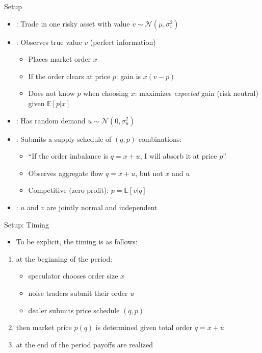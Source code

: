\documentclass[english,10pt
,aspectratio=169
]{beamer}
\begin{document}
\begin{frame}{Setup}
\begin{itemize}
	\item {}: Trade in one risky asset with value  $v \sim \mathcal{N}(\mu, \sigma^2_v)$
	\item {}: Observes true value $v$ (perfect information)
	\begin{itemize}
		\item Places market order $x$
		\item If the order clears at price $p$: gain is $x(v-p)$
		\item Does \alert{not know} $p$ when choosing $x$: maximizes \emph{expected} gain (risk neutral) given $\mathbb{E}[p|x]$
	\end{itemize}
	\item {}: Has random demand $u \sim \mathcal{N}(0, \sigma^2_u)$
	\item {}: Submits a supply schedule of $(q,p)$ combinations:
	\begin{itemize}
		\item ``If the order imbalance is $q=x+u$, I will absorb it at price $p$''
		\item Observes aggregate flow $q=x+u$, but not $x$ and $u$
		\item Competitive (zero profit): $p = \mathbb{E}[v|q]$
	\end{itemize}
	\item {}: $u$ and $v$ are jointly normal and independent
\end{itemize}
\end{frame}


\begin{frame}{Setup: Timing}
	\begin{itemize}
		\item To be explicit, the timing is as follows:
	\end{itemize}
	\begin{enumerate}
		\item at the beginning of the period:
		\begin{itemize}
			\item speculator chooses order size $x$
			\item noise traders submit their order $u$
			\item dealer submits price schedule $(q,p)$
		\end{itemize}
		\item then market price $p(q)$ is determined given total order $q=x+u$
		\item at the end of the period payoffs are realized
	\end{enumerate}
\end{frame}
\end{document}
